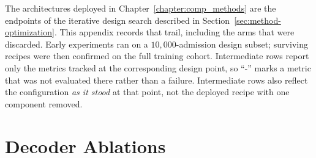 The architectures deployed in Chapter~\ref{chapter:comp_methods} are the endpoints of the iterative design search described in Section~\ref{sec:method-optimization}. This appendix records that trail, including the arms that were discarded. Early experiments ran on a $10{,}000$-admission design subset; surviving recipes were then confirmed on the full training cohort. Intermediate rows report only the metrics tracked at the corresponding design point, so ``-'' marks a metric that was not evaluated there rather than a failure. Intermediate rows also reflect the configuration \emph{as it stood} at that point, not the deployed recipe with one component removed.

\section{Decoder Ablations}
\label{app:abl-ar}

